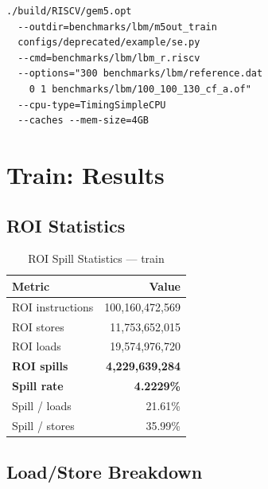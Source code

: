 \documentclass[conference]{IEEEtran}
\begin{document}
\begin{verbatim}
./build/RISCV/gem5.opt
  --outdir=benchmarks/lbm/m5out_train
  configs/deprecated/example/se.py
  --cmd=benchmarks/lbm/lbm_r.riscv
  --options="300 benchmarks/lbm/reference.dat
    0 1 benchmarks/lbm/100_100_130_cf_a.of"
  --cpu-type=TimingSimpleCPU
  --caches --mem-size=4GB
\end{verbatim}

\section{Train: Results}

\subsection{ROI Statistics}

\begin{table}[H]
\centering
\caption{ROI Spill Statistics --- train}
\label{tab:train_roi}
\begin{tabular}{lr}
\toprule
\textbf{Metric} & \textbf{Value} \\
\midrule
ROI instructions    & 100,160,472,569 \\
ROI stores          & 11,753,652,015 \\
ROI loads           & 19,574,976,720 \\
\midrule
\textbf{ROI spills} & \textbf{4,229,639,284} \\
\textbf{Spill rate} & \textbf{4.2229\%} \\
Spill / loads       & 21.61\% \\
Spill / stores      & 35.99\% \\
\bottomrule
\end{tabular}
\end{table}

\subsection{Load/Store Breakdown}
\end{document}

